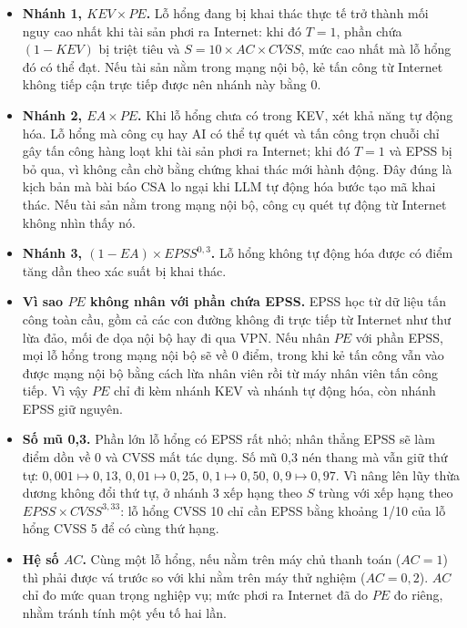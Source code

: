 \documentclass[conference]{IEEEtran}
\begin{document}
\begin{itemize}
\item \textbf{Nhánh 1, $\mathit{KEV} \times \mathit{PE}$.} Lỗ hổng đang bị khai thác thực tế trở thành
mối nguy cao nhất khi tài sản phơi ra Internet: khi đó $T = 1$, phần chứa $(1-\mathit{KEV})$ bị triệt
tiêu và $S = 10 \times AC \times \mathit{CVSS}$, mức cao nhất mà lỗ hổng đó có thể đạt. Nếu tài sản nằm
trong mạng nội bộ, kẻ tấn công từ Internet không tiếp cận trực tiếp được nên nhánh này bằng 0.
\item \textbf{Nhánh 2, $\mathit{EA} \times \mathit{PE}$.} Khi lỗ hổng chưa có trong KEV, xét khả năng tự
động hóa. Lỗ hổng mà công cụ hay AI có thể tự quét và tấn công trọn chuỗi chỉ gây tấn công hàng loạt khi
tài sản phơi ra Internet; khi đó $T = 1$ và EPSS bị bỏ qua, vì không cần chờ bằng chứng khai thác mới
hành động. Đây đúng là kịch bản mà bài báo CSA lo ngại khi LLM tự động hóa bước tạo mã khai thác. Nếu
tài sản nằm trong mạng nội bộ, công cụ quét tự động từ Internet không nhìn thấy nó.
\item \textbf{Nhánh 3, $(1-\mathit{EA}) \times \mathit{EPSS}^{0{,}3}$.} Lỗ hổng không tự động hóa được
có điểm tăng dần theo xác suất bị khai thác.
\item \textbf{Vì sao $\mathit{PE}$ không nhân với phần chứa EPSS.} EPSS học từ dữ liệu tấn công toàn cầu,
gồm cả các con đường không đi trực tiếp từ Internet như thư lừa đảo, mối đe dọa nội bộ hay đi qua VPN.
Nếu nhân $\mathit{PE}$ với phần EPSS, mọi lỗ hổng trong mạng nội bộ sẽ về 0 điểm, trong khi kẻ tấn công
vẫn vào được mạng nội bộ bằng cách lừa nhân viên rồi từ máy nhân viên tấn công tiếp. Vì vậy $\mathit{PE}$
chỉ đi kèm nhánh KEV và nhánh tự động hóa, còn nhánh EPSS giữ nguyên.
\item \textbf{Số mũ 0,3.} Phần lớn lỗ hổng có EPSS rất nhỏ; nhân thẳng EPSS sẽ làm điểm dồn về 0 và CVSS
mất tác dụng. Số mũ 0,3 nén thang mà vẫn giữ thứ tự: $0{,}001 \mapsto 0{,}13$, $0{,}01 \mapsto 0{,}25$,
$0{,}1 \mapsto 0{,}50$, $0{,}9 \mapsto 0{,}97$. Vì nâng lên lũy thừa dương không đổi thứ tự, ở nhánh 3
xếp hạng theo $S$ trùng với xếp hạng theo $\mathit{EPSS} \times \mathit{CVSS}^{3{,}33}$: lỗ hổng CVSS 10
chỉ cần EPSS bằng khoảng 1/10 của lỗ hổng CVSS 5 để có cùng thứ hạng.
\item \textbf{Hệ số $AC$.} Cùng một lỗ hổng, nếu nằm trên máy chủ thanh toán ($AC = 1$) thì phải được vá trước so với khi nằm
trên máy thử nghiệm ($AC = 0{,}2$). $AC$ chỉ đo mức quan trọng nghiệp vụ; mức phơi ra Internet đã do
$\mathit{PE}$ đo riêng, nhằm tránh tính một yếu tố hai lần.
\end{itemize}
\end{document}
